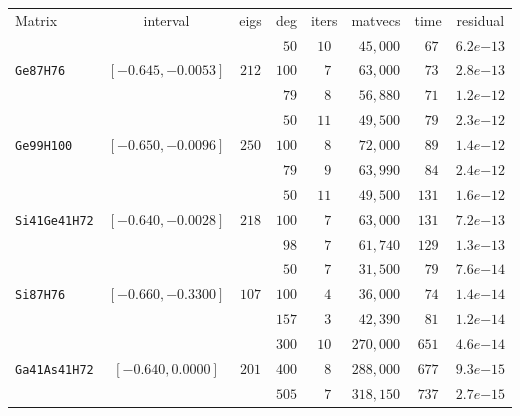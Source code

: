 \begin{tabular}{l|c|c|c|c|c|c|c}
\hline
\multirow{2}{*}{Matrix} & \multirow{2}{*}{interval} & \multirow{2}{*}{eigs} & \multirow{2}{*}{deg} & \multirow{2}{*}{iters} & \multirow{2}{*}{matvecs} & \multirow{2}{*}{time} & \multirow{2}{*}{residual} \\
 & & & & & & & \\\hline
\hline
 & & & $\phantom{0}50$ & $10$ & $\phantom{0}45,000$ & $\phantom{0}67$ & $6.2e{-13}$ \\
\verb|Ge87H76| & $[-0.645,-0.0053]$ & $212$ & $100$ & $\phantom{0}7$ & $\phantom{0}63,000$ & $\phantom{0}73$ & $2.8e{-13}$ \\
 & & & $\phantom{0}79$ & $\phantom{0}8$ & $\phantom{0}56,880$ & $\phantom{0}71$ & $1.2e{-12}$ \\\hline
 & & & $\phantom{0}50$ & $11$ & $\phantom{0}49,500$ & $\phantom{0}79$ & $2.3e{-12}$ \\
\verb|Ge99H100| & $[-0.650,-0.0096]$ & $250$ & $100$ & $\phantom{0}8$ & $\phantom{0}72,000$ & $\phantom{0}89$ & $1.4e{-12}$ \\
 & & & $\phantom{0}79$ & $\phantom{0}9$ & $\phantom{0}63,990$ & $\phantom{0}84$ & $2.4e{-12}$ \\\hline
 & & & $\phantom{0}50$ & $11$ & $\phantom{0}49,500$ & $131$ & $1.6e{-12}$ \\
\verb|Si41Ge41H72| & $[-0.640,-0.0028]$ & $218$ & $100$ & $\phantom{0}7$ & $\phantom{0}63,000$ & $131$ & $7.2e{-13}$ \\
 & & & $\phantom{0}98$ & $\phantom{0}7$ & $\phantom{0}61,740$ & $129$ & $1.3e{-13}$ \\\hline
 & & & $\phantom{0}50$ & $\phantom{0}7$ & $\phantom{0}31,500$ & $\phantom{0}79$ & $7.6e{-14}$ \\
\verb|Si87H76| & $[-0.660,-0.3300]$ & $107$ & $100$ & $\phantom{0}4$ & $\phantom{0}36,000$ & $\phantom{0}74$ & $1.4e{-14}$ \\
 & & & $157$ & $\phantom{0}3$ & $\phantom{0}42,390$ & $\phantom{0}81$ & $1.2e{-14}$ \\\hline
 & & & $300$ & $10$ & $270,000$ & $651$ & $4.6e{-14}$ \\
\verb|Ga41As41H72| & $[-0.640,0.0000]$ & $201$ & $400$ & $\phantom{0}8$ & $288,000$ & $677$ & $9.3e{-15}$ \\
 & & & $505$ & $\phantom{0}7$ & $318,150$ & $737$ & $2.7e{-15}$ \\\hline
\end{tabular}